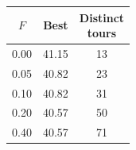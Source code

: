 \begin{tabular}{ccc}
\toprule
$F$ & Best & \makecell{Distinct\\tours} \\
\midrule
0.00 & 41.15 & 13 \\
0.05 & 40.82 & 23 \\
0.10 & 40.82 & 31 \\
0.20 & 40.57 & 50 \\
0.40 & 40.57 & 71 \\
\bottomrule
\end{tabular}
